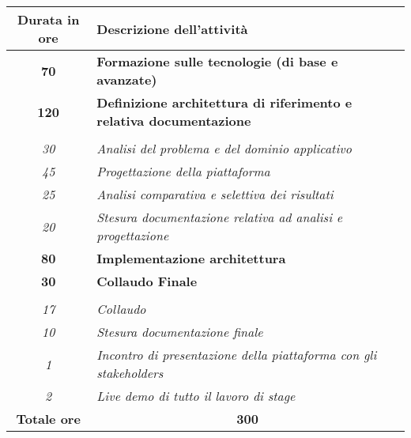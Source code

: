 

\begin{tabularx}{\textwidth}{|c|X|}
	\hline
	\textbf{Durata in ore} & \textbf{Descrizione dell'attività} \\\hline
	
	\textbf{70} & \textbf{Formazione sulle tecnologie (di base e avanzate)} \\	 
    \hline
    
    \textbf{120} & \textbf{Definizione architettura di riferimento e relativa documentazione} \\ \hdashline 
    \multirow{3}{0cm}\\ 
    \textit{30} & 
    \textit{Analisi del problema e del dominio applicativo} \\
    \textit{45} & 
    \textit{Progettazione della piattaforma} \\
    \textit{25} & 
    \textit{Analisi comparativa e selettiva dei risultati} \\
    \textit{20} & 
    \textit{Stesura documentazione relativa ad analisi e progettazione} \\
    
    \hline
    
    \textbf{80} & \textbf{Implementazione architettura } \\
    
    \hline
    
    \textbf{30} & \textbf{Collaudo Finale}  \\ \hdashline 
    \multirow{4}{0cm}\\ 
    \textit{17} & 
    \textit{Collaudo} \\
    \textit{10} & 
    \textit{Stesura documentazione finale} \\
    \textit{1} & 
    \textit{Incontro di presentazione della piattaforma con gli stakeholders} \\
    \textit{2} & 
    \textit{Live demo di tutto il lavoro di stage} \\
    \hline
	
	\textbf{Totale ore} & \multicolumn{1}{|c|}{\textbf{300}} \\\hline
	
	
\end{tabularx}